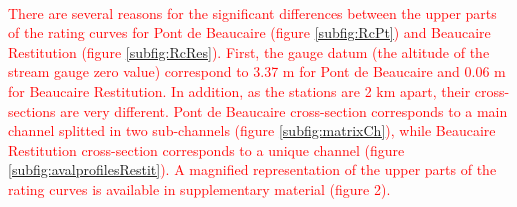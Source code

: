 \documentclass[11pt]{article}
\begin{document}
    \paragraph{}\textcolor{red}{
There are several reasons for the significant differences between the upper parts of the rating curves for Pont de Beaucaire (figure \ref{subfig:RcPt}) and Beaucaire Restitution (figure \ref{subfig:RcRes}). First, the gauge datum (the altitude of the stream gauge zero value) correspond to 3.37 m for Pont de Beaucaire and 0.06 m for Beaucaire Restitution. In addition, as the stations are 2 km apart, their cross-sections are very different. Pont de Beaucaire cross-section corresponds to a main channel splitted in two sub-channels (figure \ref{subfig:matrixCh}), while Beaucaire Restitution cross-section corresponds to a unique channel (figure \ref{subfig:avalprofilesRestit}). A magnified representation of the upper parts of the rating curves is available in supplementary material (figure 2).}
    
\end{document}
